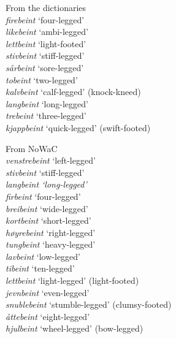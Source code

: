 \documentclass[output=paper]{LSP/langsci}
\begin{document}
\noindent
\begin{minipage}[t]{.5\textwidth}
\ea\label{ex:bondi:6} {From the dictionaries}\\
 \textit{firebeint} ‘four-legged’                  \\             
 \textit{likebeint} ‘ambi-legged’                  \\
 \textit{lettbeint} ‘light-footed’                 \\
 \textit{stivbeint} ‘stiff-legged’                 \\
 \textit{sårbeint} ‘sore-legged’                   \\
 \textit{tobeint} ‘two-legged’                     \\
 \textit{kalvbeint} ‘calf-legged’ (knock-kneed)    \\
 \textit{langbeint} ‘long-legged’                  \\
 \textit{trebeint} ‘three-legged’                  \\
 \textit{kjappbeint} ‘quick-legged’ (swift-footed) \\
\z
\end{minipage}
\begin{minipage}[t]{.5\textwidth}
\ea\label{ex:bondi:7} {From NoWaC} \\ 
\textit{venstrebeint} ‘left-legged’\\
\textit{stivbeint} ‘stiff-legged’\\
\textit{langbeint ‘long-legged’}\\
\textit{firbeint} ‘four-legged’\\
\textit{breibeint} ‘wide-legged’\\
\textit{kortbeint} ‘short-legged’\textit{} \\
\textit{høyrebeint} ‘right-legged’\\
\textit{tungbeint} ‘heavy-legged’\\
\textit{lavbeint} ‘low-legged’\\
\textit{tibeint} ‘ten-legged’\\
\textit{lettbeint} ‘light-legged’ (light-footed)\\
\textit{jevnbeint} ‘even-legged’\\
\textit{snublebeint} ‘stumble-legged’ (clumsy-footed)\\
\textit{åttebeint} ‘eight-legged’\\
\textit{hjulbeint} ‘wheel-legged’ (bow-legged)\\
\z
\end{minipage}\medskip
\end{document}
